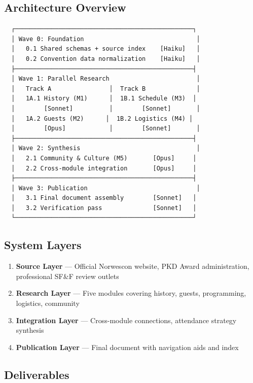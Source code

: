 \documentclass[11pt,letterpaper]{article}
\begin{document}
\subsection{Architecture Overview}

\begin{asciibox}
\begin{verbatim}
  ┌─────────────────────────────────────────────────┐
  │ Wave 0: Foundation                               │
  │   0.1 Shared schemas + source index    [Haiku]   │
  │   0.2 Convention data normalization    [Haiku]   │
  ├─────────────────────────────────────────────────┤
  │ Wave 1: Parallel Research                        │
  │   Track A                │  Track B              │
  │   1A.1 History (M1)      │  1B.1 Schedule (M3)  │
  │        [Sonnet]          │        [Sonnet]       │
  │   1A.2 Guests (M2)      │  1B.2 Logistics (M4) │
  │        [Opus]            │        [Sonnet]       │
  ├─────────────────────────────────────────────────┤
  │ Wave 2: Synthesis                                │
  │   2.1 Community & Culture (M5)       [Opus]     │
  │   2.2 Cross-module integration       [Opus]     │
  ├─────────────────────────────────────────────────┤
  │ Wave 3: Publication                              │
  │   3.1 Final document assembly        [Sonnet]   │
  │   3.2 Verification pass              [Sonnet]   │
  └─────────────────────────────────────────────────┘
\end{verbatim}
\end{asciibox}

\subsection{System Layers}

\begin{enumerate}[leftmargin=2em]
\item \textbf{Source Layer} --- Official Norwescon website, PKD Award administration, professional SF\&F review outlets
\item \textbf{Research Layer} --- Five modules covering history, guests, programming, logistics, community
\item \textbf{Integration Layer} --- Cross-module connections, attendance strategy synthesis
\item \textbf{Publication Layer} --- Final document with navigation aids and index
\end{enumerate}

\subsection{Deliverables}
\end{document}

